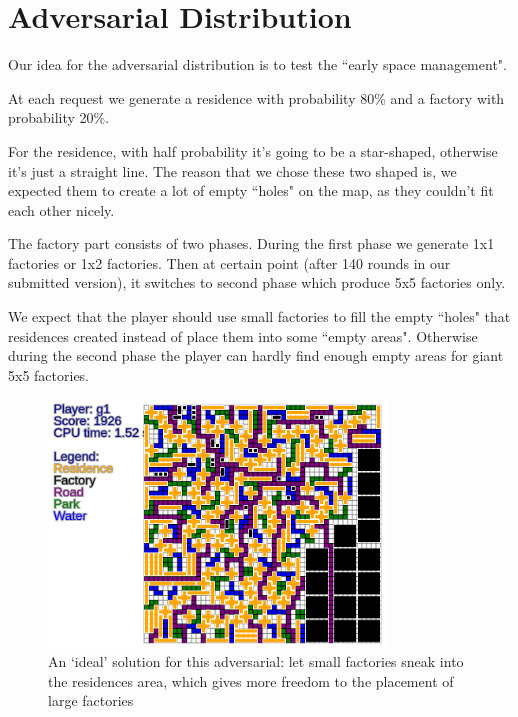 \section{Adversarial Distribution}

Our idea for the adversarial distribution is to test the ``early space management".

At each request we generate a residence with probability 80\% and a factory with probability 20\%.

For the residence, with half probability it's going to be a star-shaped, otherwise it's just a straight line.
The reason that we chose these two shaped is, we expected them to create a lot of empty ``holes" on the map, as
they couldn't fit each other nicely.

The factory part consists of two phases. During the first phase we generate 1x1 factories or 1x2 factories.
Then at certain point (after 140 rounds in our submitted version), it switches to second phase which produce
5x5 factories only.

We expect that the player should use small factories to fill the empty ``holes" that residences created instead of
place them into some ``empty areas". Otherwise during the second phase the player can hardly find enough empty areas
for giant 5x5 factories.

\begin{figure}[ht]
\centering
\includegraphics[width=0.8\textwidth]{IdealSolutionForAdversarial.png}
\caption{An `ideal' solution for this adversarial: let small factories
sneak into the residences area, which gives more freedom to the placement
of large factories}
\end{figure}
